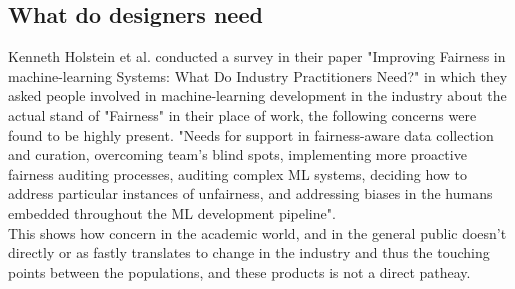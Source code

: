 \subsection{What do designers need}
Kenneth Holstein et al. conducted a survey in their paper "Improving Fairness in machine-learning Systems:
What Do Industry Practitioners Need?"\cite{HWD*19} in which they asked people involved in machine-learning development in the industry about the actual stand of "Fairness" in their place of work, the following concerns were found to be highly present.
"Needs for support in fairness-aware data collection and curation, overcoming team’s blind spots, implementing more proactive fairness auditing processes, auditing complex ML systems, deciding how to address particular instances of unfairness, and addressing biases in the humans embedded throughout the ML development pipeline". \\
This shows how concern in the academic world, and in the general public doesn't directly or as fastly translates to change in the industry and thus the touching points between the populations, and these products is not a direct patheay.


